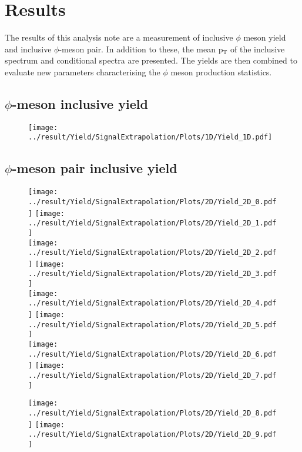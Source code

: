 \section{Results}
\label{sec:Results}
The results of this analysis note are a measurement of inclusive $\phi$ meson yield and inclusive $\phi$-meson pair. In addition to these, the mean p$_{\text{T}}$ of the inclusive spectrum and conditional spectra are presented. The yields are then combined to evaluate new parameters characterising the $\phi$ meson production statistics.

\subsection{$\phi$-meson inclusive yield}

\begin{figure}
\centering
\texttt{[image: ../result/Yield/SignalExtrapolation/Plots/1D/Yield\_1D.pdf]}
\label{fig:spectrum1D}
\caption{}
\end{figure}

\subsection{$\phi$-meson pair inclusive yield}

\begin{figure}[!h]
	\centering
		\texttt{[image: ../result/Yield/SignalExtrapolation/Plots/2D/Yield\_2D\_0.pdf]}
		\texttt{[image: ../result/Yield/SignalExtrapolation/Plots/2D/Yield\_2D\_1.pdf]}\\
		\texttt{[image: ../result/Yield/SignalExtrapolation/Plots/2D/Yield\_2D\_2.pdf]}
		\texttt{[image: ../result/Yield/SignalExtrapolation/Plots/2D/Yield\_2D\_3.pdf]}\\
		\texttt{[image: ../result/Yield/SignalExtrapolation/Plots/2D/Yield\_2D\_4.pdf]}
		\texttt{[image: ../result/Yield/SignalExtrapolation/Plots/2D/Yield\_2D\_5.pdf]}\\
		\texttt{[image: ../result/Yield/SignalExtrapolation/Plots/2D/Yield\_2D\_6.pdf]}
		\texttt{[image: ../result/Yield/SignalExtrapolation/Plots/2D/Yield\_2D\_7.pdf]}
\end{figure}

\begin{figure}[!h]
	\centering
		\texttt{[image: ../result/Yield/SignalExtrapolation/Plots/2D/Yield\_2D\_8.pdf]}
		\texttt{[image: ../result/Yield/SignalExtrapolation/Plots/2D/Yield\_2D\_9.pdf]}
\end{figure}

